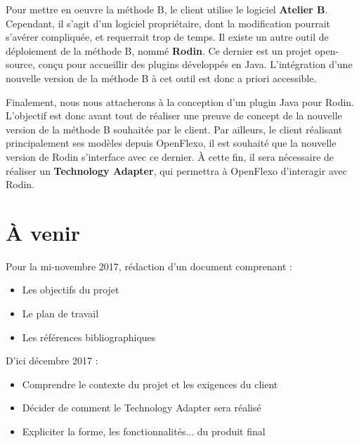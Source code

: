 \documentclass{article}
\begin{document}
Pour mettre en oeuvre la méthode B, le client utilise le logiciel \textbf{Atelier B}.
Cependant, il s'agit d'un logiciel propriétaire, dont la modification pourrait s'avérer compliquée, et requerrait trop de temps.
Il existe un autre outil de déploiement de la méthode B, nommé \textbf{Rodin}.
Ce dernier est un projet open-source, conçu pour accueillir des plugins développés en Java.
L'intégration d'une nouvelle version de la méthode B à cet outil est donc a priori accessible.

Finalement, nous nous attacherons à la conception d'un plugin Java pour Rodin.
L'objectif est donc avant tout de réaliser une preuve de concept de la nouvelle version de la méthode B souhaitée par le client.
Par ailleurs, le client réalisant principalement ses modèles depuis OpenFlexo, il est souhaité que la nouvelle version de Rodin s'interface avec ce dernier.
À cette fin, il sera nécessaire de réaliser un \textbf{Technology Adapter}, qui permettra à OpenFlexo d'interagir avec Rodin.


\section*{À venir}

Pour la mi-novembre 2017, rédaction d'un document comprenant :

\begin{itemize}
    \item Les objectifs du projet
    \item Le plan de travail
    \item Les références bibliographiques
\end{itemize}

\noindent D'ici décembre 2017 :

\begin{itemize}
\item Comprendre le contexte du projet et les exigences du client
\item Décider de comment le Technology Adapter sera réalisé
\item Expliciter la forme, les fonctionnalités... du produit final
\end{itemize}
\end{document}
